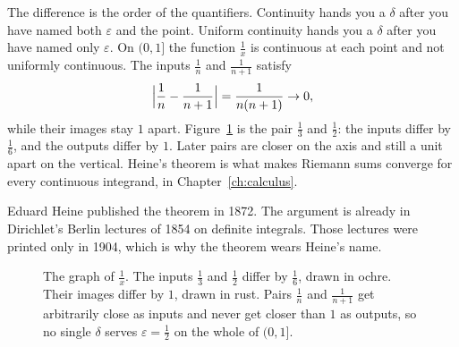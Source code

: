 The difference is the order of the quantifiers. Continuity hands you a $\delta$ after you have named both $\varepsilon$ and the point. Uniform continuity hands you a $\delta$ after you have named only $\varepsilon$. On $(0,1]$ the function $\frac1x$ is continuous at each point and not uniformly continuous. The inputs $\frac1n$ and $\frac1{n+1}$ satisfy
\[
\Bigl|\frac1n-\frac1{n+1}\Bigr|=\frac1{n(n+1)}\to0,
\]
while their images stay $1$ apart. Figure~\ref{fig:uniform} is the pair $\frac13$ and $\frac12$: the inputs differ by $\frac16$, and the outputs differ by $1$. Later pairs are closer on the axis and still a unit apart on the vertical. Heine's theorem is what makes Riemann sums converge for every continuous integrand, in Chapter~\ref{ch:calculus}.

Eduard Heine published the theorem in 1872. The argument is already in Dirichlet's Berlin lectures of 1854 on definite integrals. Those lectures were printed only in 1904, which is why the theorem wears Heine's name.

\begin{figure}[ht]
\centering
{}
\caption{The graph of $\frac1x$. The inputs $\frac13$ and $\frac12$ differ by $\frac16$, drawn in ochre. Their images differ by $1$, drawn in rust. Pairs $\frac1n$ and $\frac1{n+1}$ get arbitrarily close as inputs and never get closer than $1$ as outputs, so no single $\delta$ serves $\varepsilon=\frac12$ on the whole of $(0,1]$.}
\label{fig:uniform}
\end{figure}

